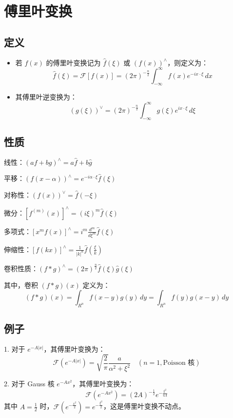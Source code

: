 \section{傅里叶变换}

\subsection{定义}
\begin{itemize}
    \item 若 $f(x)$ 的傅里叶变换记为 $\hat{f}(\xi)$ 或 $(f(x))^{\wedge}$，则定义为：
    \[
    \hat{f}(\xi) = \mathcal{F}[f(x)] = (2\pi)^{-\frac{n}{2}} \int_{-\infty}^{\infty} f(x) e^{-ix \cdot \xi} \, dx
    \]
    \item 其傅里叶逆变换为：
    \[
    (g(\xi))^{\vee} = (2\pi)^{-\frac{n}{2}} \int_{-\infty}^{\infty} g(\xi) e^{ix \cdot \xi} \, d\xi
    \]
\end{itemize}

\subsection{性质}

线性：$(af + bg)^{\wedge} = a \hat{f} + b \hat{g}$

平移：$(f(x - \alpha))^{\wedge} = e^{-i \alpha \cdot \xi} \hat{f}(\xi)$

对称性：$(f(x))^{\vee} = \hat{f}(-\xi)$

微分：$[f^{(m)}(x)]^{\wedge} = (i \xi)^m \hat{f}(\xi)$

多项式：$[x^m f(x)]^{\wedge} = i^m \frac{d^m}{d \xi^m} \hat{f}(\xi)$

伸缩性：$[f(kx)]^{\wedge} = \frac{1}{|k|^n} \hat{f} \left( \frac{\xi}{k} \right)$

卷积性质：$(f * g)^{\wedge}  = (2\pi)^{\frac{n}{2}} \hat{f}(\xi) \hat{g}(\xi)$


其中，卷积 $(f * g)(x)$ 定义为：
\[
(f * g)(x) = \int_{R^n} f(x - y) g(y) \, dy = \int_{R^n} f(y) g(x - y) \, dy
\]

\subsection{例子}
1. 对于 $e^{-A|x|}$，其傅里叶变换为：
   \[
   \mathcal{F}\left( e^{-A|x|} \right) = \sqrt{\frac{2}{\pi}} \frac{a}{\alpha^2 + \xi^2} \quad (n=1, \text{Poisson 核})
   \]

2. 对于 Gauss 核 $e^{-Ax^2}$，其傅里叶变换为：
   \[
   \mathcal{F}\left( e^{-Ax^2} \right) = (2A)^{-\frac{1}{2}} e^{-\frac{\xi^2}{4A}}
   \]
   其中 $A = \frac{1}{2}$ 时，$\mathcal{F}\left( e^{-\frac{x^2}{2}} \right) = e^{-\frac{\xi^2}{2}}$，这是傅里叶变换不动点。
